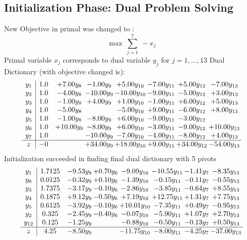 \documentclass[8pt]{article}
\begin{document}
\subsection{Initialization Phase: Dual Problem Solving}
New Objective in primal was changed to : \[ \max\ \sum_{j=1}^{7}\ - x_j \] 
Primal variable $x_j$ corresponds to dual variable $y_j$ for $j = 1,\ldots,13$
Dual Dictionary (with objective changed is): 
\[\begin{array}{c| c c@{\hskip 2pt} c@{\hskip 2pt} c@{\hskip 2pt} c@{\hskip 2pt} c@{\hskip 2pt} c@{\hskip 2pt} }
 y_{1}   &  1.0 & +  7.00 y_{8} & -1.00 y_{9} & +  5.00 y_{10} & -7.00 y_{11} & +  5.00 y_{12} & -7.00 y_{13}\\
 y_{2}   &  1.0 & -4.00 y_{8} & -10.00 y_{9} & -10.00 y_{10} & -9.00 y_{11} & -5.00 y_{12} & +  3.00 y_{13}\\
 y_{3}   &  1.0 & -1.00 y_{8} & +  4.00 y_{9} & +  1.00 y_{10} & -1.00 y_{11} & +  6.00 y_{12} & +  5.00 y_{13}\\
 y_{4}   &  1.0 & -5.00 y_{8} &   & -5.00 y_{10} & +  9.00 y_{11} & -6.00 y_{12} & +  8.00 y_{13}\\
 y_{5}   &  1.0 & -1.00 y_{8} & -8.00 y_{9} & +  6.00 y_{10} & -9.00 y_{11} & -3.00 y_{12} &   \\
 y_{6}   &  1.0 & + 10.00 y_{8} & -8.00 y_{9} & +  6.00 y_{10} & -3.00 y_{11} & -9.00 y_{12} & + 10.00 y_{13}\\
 y_{7}   &  1.0  &   & -10.00 y_{9} & -7.00 y_{10} & -4.00 y_{11} & -8.00 y_{12} & +  4.00 y_{13}\\
\hline
z    &  -0  &   & + 34.00 y_{9} & + 18.00 y_{10} & +  9.00 y_{11} & + 34.00 y_{12} & -54.00 y_{13}\\
\end{array}\]
Initialization succeeded in finding final dual dictionary with 5 pivots
\[\begin{array}{c| c c@{\hskip 2pt} c@{\hskip 2pt} c@{\hskip 2pt} c@{\hskip 2pt} c@{\hskip 2pt} c@{\hskip 2pt} }
 y_{1}   &  1.7125 & -9.53 y_{9} & +  0.70 y_{6} & -9.09 y_{10} & -10.55 y_{11} & -1.41 y_{7} & -8.35 y_{13}\\
 y_{8}   &  0.0125 & -0.32 y_{9} & +  0.10 y_{6} & -1.39 y_{10} & -0.15 y_{11} & -0.11 y_{7} & -0.55 y_{13}\\
 y_{3}   &  1.7375 & -3.17 y_{9} & -0.10 y_{6} & -2.86 y_{10} & -3.85 y_{11} & -0.64 y_{7} & +  8.55 y_{13}\\
 y_{4}   &  0.1875 & +  9.12 y_{9} & -0.50 y_{6} & +  7.19 y_{10} & + 12.75 y_{11} & +  1.31 y_{7} & +  7.75 y_{13}\\
 y_{5}   &  0.6125 & -3.92 y_{9} & -0.10 y_{6} & + 10.01 y_{10} & -7.35 y_{11} & +  0.49 y_{7} & -0.95 y_{13}\\
 y_{2}   &  0.325 & -2.45 y_{9} & -0.40 y_{6} & -0.07 y_{10} & -5.90 y_{11} & +  1.07 y_{7} & +  2.70 y_{13}\\
 y_{12}   &  0.125 & -1.25 y_{9} &   & -0.88 y_{10} & -0.50 y_{11} & -0.13 y_{7} & +  0.50 y_{13}\\
\hline
z    &  4.25 & -8.50 y_{9} &   & -11.75 y_{10} & -8.00 y_{11} & -4.25 y_{7} & -37.00 y_{13}\\
\end{array}\]
\end{document}
